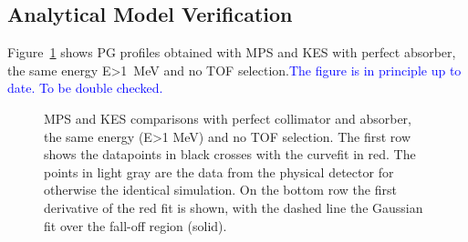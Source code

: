 \documentclass[a4paper,english,12pt]{article}
\newcommand{\et}[2][blue]{\textcolor{#1}{#2}}
\begin{document}
\subsection{Analytical Model Verification}

Figure~\ref{fig:PGprofileFairComp} shows PG profiles obtained with MPS and KES with perfect absorber, the same energy E>1~MeV and no TOF selection.\et{The figure is in principle up to date. To be double checked.}

\begin{figure}[!htp]
  \centering
  \quad
  \caption{\label{fig:PGprofileFairComp} MPS and KES comparisons with perfect collimator and absorber, the same energy (E>1 MeV) and no TOF selection. The first row shows the datapoints in black crosses with the curvefit in red. The points in light gray are the data from the physical detector for otherwise the identical simulation. On the bottom row the first derivative of the red fit is shown, with the dashed line the Gaussian fit over the fall-off region (solid). }
\end{figure}  


\end{document}
